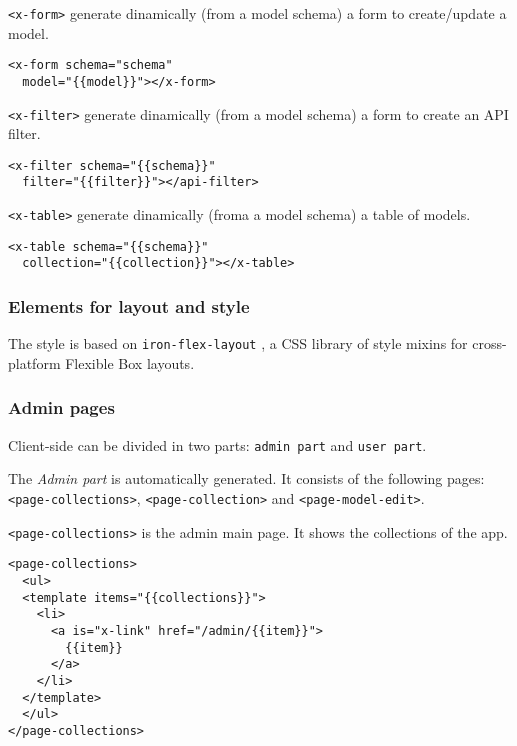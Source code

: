\texttt{<x-form>} generate dinamically (from a model schema) a form to create/update a model.

\begin{lstlisting}[language=HTML5]
<x-form schema="schema" 
  model="{{model}}"></x-form>
\end{lstlisting}

\texttt{<x-filter>} generate dinamically (from a model schema) a form to create an API filter.

\begin{lstlisting}[language=HTML5]
<x-filter schema="{{schema}}"
  filter="{{filter}}"></api-filter>
\end{lstlisting}

\texttt{<x-table>} generate dinamically (froma a model schema) a table of models. 

\begin{lstlisting}[language=HTML5]
<x-table schema="{{schema}}" 
  collection="{{collection}}"></x-table>
\end{lstlisting}

\subsubsection{Elements for layout and style}

The style is based on \texttt{iron-flex-layout} \cite{iron-elements}, a CSS library of style mixins for cross-platform Flexible Box \cite{css-flexbox} layouts.




\subsubsection{Admin pages}

Client-side can be divided in two parts: \texttt{admin part} and \texttt{user part}.

The \emph{Admin part} is automatically generated. 
It consists of the following pages: \texttt{<page-collections>}, \texttt{<page-collection>} and \texttt{<page-model-edit>}.

\texttt{<page-collections>} is the admin main page. It shows the collections of the app. 

\begin{lstlisting}[language=HTML5]
<page-collections>
  <ul>
  <template items="{{collections}}">
    <li>
      <a is="x-link" href="/admin/{{item}}">
        {{item}}
      </a>
    </li>
  </template>
  </ul>
</page-collections>
\end{lstlisting}

